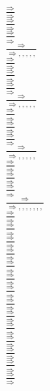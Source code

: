 \documentclass[11pt]{article}
\begin{document}
\begin{center}
\bigskip
\\$\frac{\Rightarrow }{\Rightarrow }$
\bigskip
\\$\frac{\Rightarrow }{\Rightarrow }$
\bigskip
\\$\frac{\Rightarrow }{\Rightarrow }$
\bigskip
\\$\frac{\Rightarrow }{\Rightarrow , , , , , }$
\bigskip
\\$\frac{\Rightarrow }{\Rightarrow }$
\bigskip
\\$\frac{\Rightarrow }{\Rightarrow }$
\bigskip
\\$\frac{\Rightarrow }{\Rightarrow }$
\bigskip
\\$\frac{\Rightarrow }{\Rightarrow , , , , , }$
\bigskip
\\$\frac{\Rightarrow }{\Rightarrow }$
\bigskip
\\$\frac{\Rightarrow }{\Rightarrow }$
\bigskip
\\$\frac{\Rightarrow }{\Rightarrow }$
\bigskip
\\$\frac{\Rightarrow }{\Rightarrow , , , , , }$
\bigskip
\\$\frac{\Rightarrow }{\Rightarrow }$
\bigskip
\\$\frac{\Rightarrow }{\Rightarrow }$
\bigskip
\\$\frac{\Rightarrow }{\Rightarrow }$
\bigskip
\\$\frac{\Rightarrow }{\Rightarrow , , , , , , , }$
\bigskip
\\$\frac{\Rightarrow }{\Rightarrow }$
\bigskip
\\$\frac{\Rightarrow }{\Rightarrow }$
\bigskip
\\$\frac{\Rightarrow }{\Rightarrow }$
\bigskip
\\$\frac{\Rightarrow }{\Rightarrow }$
\bigskip
\\$\frac{\Rightarrow }{\Rightarrow }$
\bigskip
\\$\frac{\Rightarrow }{\Rightarrow }$
\bigskip
\\$\frac{\Rightarrow }{\Rightarrow }$
\bigskip
\\$\frac{\Rightarrow }{\Rightarrow }$
\bigskip
\\$\frac{\Rightarrow }{\Rightarrow }$
\bigskip
\\$\frac{\Rightarrow }{\Rightarrow }$
\bigskip
\\$\frac{\Rightarrow }{\Rightarrow }$
\bigskip
\\$\frac{\Rightarrow }{\Rightarrow }$
\bigskip
\\$\frac{\Rightarrow }{\Rightarrow }$
\bigskip
\\$\frac{\Rightarrow }{\Rightarrow }$

\end{center}
\end{document}
